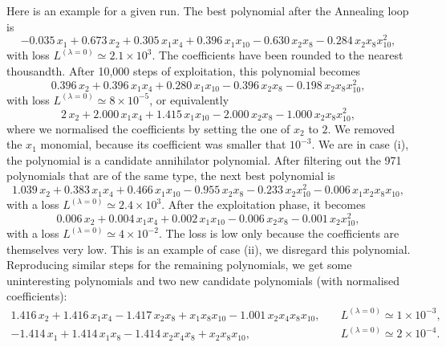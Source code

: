 \documentclass[11pt,a4paper]{article}
\begin{document}
	Here is an example for a given run. The best polynomial after the Annealing loop is
	 \begin{equation}
	 	-0.035\,x_{1} + 0.673\,x_{2} + 0.305\,x_{1}x_{4} + 0.396\,x_{1}x_{10} - 0.630\,x_{2}x_{8} - 0.284\,x_{2}x_{8}x_{10}^{2},
	 \end{equation}
	 with loss $L^{(\lambda = 0)} \simeq 2.1 \times 10^{3}$. The coefficients have been rounded to the nearest thousandth. After 10,000 steps of exploitation, this polynomial becomes
	  \begin{equation}
	 	0.396\,x_{2} + 0.396\,x_{1}x_{4} + 0.280\,x_{1}x_{10} - 0.396\,x_{2}x_{8} - 0.198\,x_{2}x_{8}x_{10}^{2},
	 \end{equation}
	 with loss $L^{(\lambda = 0)} \simeq 8 \times 10^{-5}$, or equivalently
	 \begin{equation} \label{eq:expol1}
	 	2\,x_{2} + 2.000\,x_{1}x_{4} + 1.415\,x_{1}x_{10} - 2.000\,x_{2}x_{8} - 1.000\,x_{2}x_{8}x_{10}^{2},
	 \end{equation}
	 where we normalised the coefficients by setting the one of $x_{2}$ to $2$. We removed the $x_1$ monomial, because its coefficient was smaller that $10^{-3}$. We are in case (i), the polynomial is a candidate annihilator polynomial. After filtering out the 971 polynomials that are of the same type, the next best polynomial is
	 \begin{equation}
	 	1.039\,x_{2} + 0.383\,x_{1}x_{4} + 0.466\,x_{1}x_{10} - 0.955\,x_{2}x_{8} - 0.233\,x_{2}x_{10}^{2} - 0.006\,x_{1}x_{2}x_{8}x_{10},
	 \end{equation}
	 with a loss $L^{(\lambda = 0)} \simeq 2.4 \times 10^{3}$. After the exploitation phase, it becomes
	 \begin{equation}
	 	0.006\,x_{2} + 0.004\,x_{1}x_{4} + 0.002\,x_{1}x_{10} - 0.006\,x_{2}x_{8} - 0.001\,x_{2}x_{10}^{2},
	 \end{equation}
	 with a loss $L^{(\lambda = 0)} \simeq 4 \times 10^{-2}$. The loss is low only because the coefficients are themselves very low. This is an example of case (ii), we disregard this polynomial. Reproducing similar steps for the remaining polynomials, we get some uninteresting polynomials and two new candidate polynomials (with normalised coefficients):
	 \begin{subequations}
	    \begin{align}
			1.416\,x_{2} + 1.416\,x_{1}x_{4} - 1.417\,x_{2}x_{8} + x_{1}x_{8}x_{10} - 1.001\,x_{2}x_{4}x_{8}x_{10},\quad &L^{(\lambda = 0)} \simeq 1 \times 10^{-3}, \label{eq:expol2}\\
			-1.414\,x_{1} + 1.414\,x_{1}x_{8} - 1.414\,x_{2}x_{4}x_{8} + x_{2}x_{8}x_{10},\quad &L^{(\lambda = 0)} \simeq 2 \times 10^{-4}. \label{eq:expol3}
		\end{align}
	\end{subequations}
\end{document}
